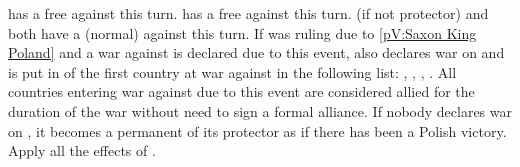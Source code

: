 \phdipl
\aparag \RUS has a free \CB against \payspologne this turn.
\aparag \AUS has a free \CB against \payspologne this turn.
\aparag \SUE (if not protector) and \PRU both have a (normal) \CB against
\payspologne this turn.
\aparag If \payssaxe was ruling \payspologne due to \ref{pV:Saxon King Poland}
and a war against \payspologne is declared due to this event, \payssaxe also
declares war on \payspologne and is put in \EG of the first country at war
against \payspologne in the following list: \RUS, \AUS, \SUE, \PRU.
\aparag All countries entering war against \payspologne due to this event are
considered allied for the duration of the war without need to sign a formal
alliance.
\aparag If nobody declares war on \payspologne, it becomes a permanent \EG of
its protector as if there has been a Polish victory. Apply all the effects of
.

